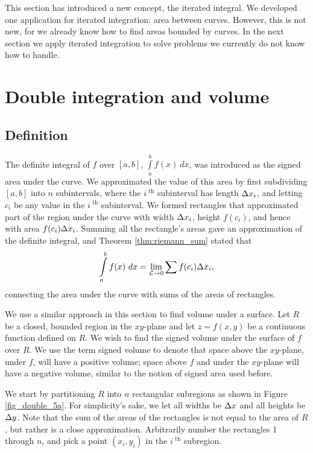 This section has introduced a new concept, the iterated integral. We developed one application for iterated integration: area between curves. However, this is not new, for we already know how to find areas bounded by curves. In the next section we apply iterated integration to solve problems we currently do not know how to handle. 


\section{Double integration and volume}\label{sec:double_int_volume}
\subsection{Definition}

The definite integral of $f$ over $[a,b]$, $\int\limits_a^b f(x)\ dx$, was introduced as the signed area under the curve. We approximated the value of this area by first subdividing $[a,b]$ into $n$ subintervals, where the $i^\text{ th}$ subinterval has length $\Delta x_i$, and letting $c_i$ be any value in the $i^\text{ th}$ subinterval. We formed rectangles that approximated part of the region under the curve with width $\Delta x_i$, height $f(c_i)$, and hence with area $f(c_i)\Delta x_i$. Summing all the rectangle's areas gave an approximation of the definite integral, and Theorem \ref{thm:riemann_sum} stated that
$$\int\limits_a^bf(x)\ dx = \lim_{\mathcal{L}\to 0}\sum f(c_i)\Delta x_i,$$
connecting the area under the curve with sums of the areas of rectangles.

We use a similar approach in this section to find volume under a surface. Let $R$ be a closed, bounded region in the $xy$-plane and let $z=f(x,y)$ be a continuous function defined on $R$. We wish to find the signed volume under the surface of $f$ over $R$. We use the term signed volume to denote that space above the $xy$-plane, under $f$, will have a positive volume; space above $f$ and under the $xy$-plane will have a negative volume, similar to the notion of signed area used before.

We start by partitioning $R$ into $n$ rectangular subregions as shown in Figure \ref{fig_double_5a}. For simplicity's sake, we let all widths be $\Delta x$ and all heights be $\Delta y$. Note that the sum of the areas of the rectangles is not equal to the area of $R$, but rather is a close approximation. Arbitrarily number the rectangles 1 through $n$, and pick a point $(x_i,y_i)$ in the $i^\text{ th}$ subregion. 


